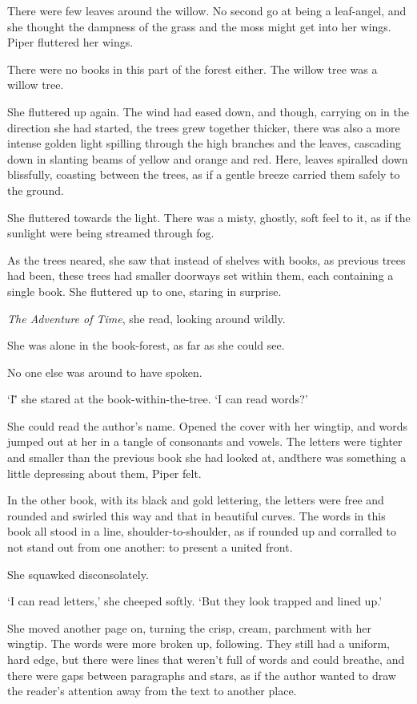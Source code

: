 There were few leaves around the willow. No second go at being a
leaf-angel, and she thought the dampness of the grass and the moss
might get into her wings. Piper fluttered her wings.

There were no books in this part of the forest either. The willow tree
was a willow tree.

She fluttered up again. The wind had eased down, and though, carrying
on in the direction she had started, the trees grew together thicker,
there was also a more intense golden light spilling through the high
branches and the leaves, cascading down in slanting beams of yellow
and orange and red. Here, leaves spiralled down blissfully, coasting
between the trees, as if a gentle breeze carried them safely to the
ground.

She fluttered towards the light. There was a misty, ghostly, soft feel
to it, as if the sunlight were being streamed through fog.

As the trees neared, she saw that instead of shelves with books, as
previous trees had been, these trees had smaller doorways set within
them, each containing a single book. She fluttered up to one, staring
in surprise. %

\textit{The Adventure of Time}, she read, looking around wildly.

She was alone in the book-forest, as far as she could see.

No one else was around to have spoken.

`I\=' she stared at the book-within-the-tree. `I can read words?'

She could read the author's name. Opened the cover with her wingtip,
and words jumped out at her in a tangle of consonants and vowels. The
letters were tighter and smaller than the previous book she had looked
at, and\=there was something a little depressing about them, Piper
felt.

In the other book, with its black and gold lettering, the letters were
free and rounded and swirled this way and that in beautiful
curves. The words in this book all stood in a line,
shoulder-to-shoulder, as if rounded up and corralled to not stand out
from one another: to present a united front.

She squawked disconsolately.

`I can read letters,' she cheeped softly. `But they look trapped and
lined up.'

She moved another page on, turning the crisp, cream, parchment with
her wingtip. The words were more broken up, following. They still had
a uniform, hard edge, but there were lines that weren't full of words
and could breathe, and there were gaps between paragraphs and stars,
as if the author wanted to draw the reader's attention away from the
text to another place.

